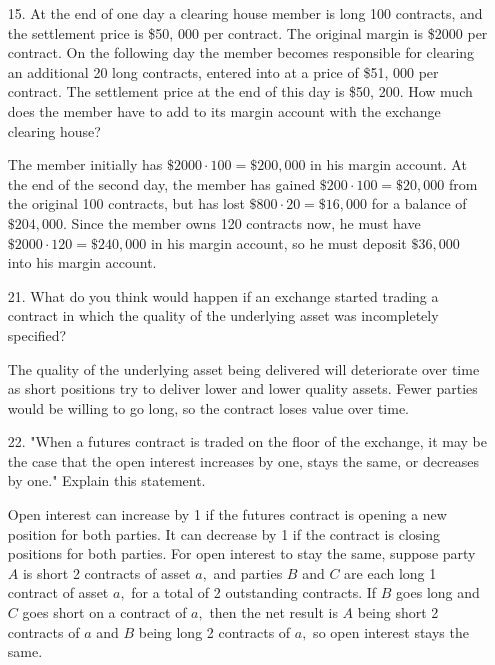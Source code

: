 \documentclass{article}
\begin{document}
\begin{itemize}
	\item[15.] At the end of one day a clearing house member is long 100 contracts, and the settlement price is \$50, 000 per contract. The original margin is \$2000 per contract. On the following day the member becomes responsible for clearing an additional 20 long contracts, entered into at a price of \$51, 000 per contract. The settlement price at the end of this day is \$50, 200. How much does the member have to add to its margin account with the exchange clearing house?
		\begin{soln}
			The member initially has $\$2000\cdot 100=\$200, 000$ in his margin account. At the end of the second day, the member has gained $\$200\cdot 100 = \$20, 000$ from the original 100 contracts, but has lost $\$800\cdot 20 = \$16, 000$ for a balance of $\$204, 000.$ Since the member owns 120 contracts now, he must have $\$2000\cdot 120 = \$240, 000$ in his margin account, so he must deposit $\$36, 000$ into his margin account.
		\end{soln}

	\item[21.] What do you think would happen if an exchange started trading a contract in which the quality of the underlying asset was incompletely specified?
		\begin{answer*}
			The quality of the underlying asset being delivered will deteriorate over time as short positions try to deliver lower and lower quality assets. Fewer parties would be willing to go long, so the contract loses value over time.
		\end{answer*}

	\item[22.] "When a futures contract is traded on the floor of the exchange, it may be the case that the open interest increases by one, stays the same, or decreases by one." Explain this statement.
		\begin{answer*}
			Open interest can increase by 1 if the futures contract is opening a new position for both parties. It can decrease by 1 if the contract is closing positions for both parties. For open interest to stay the same, suppose party $A$ is short 2 contracts of asset $a,$ and parties $B$ and $C$ are each long 1 contract of asset $a,$ for a total of 2 outstanding contracts. If $B$ goes long and $C$ goes short on a contract of $a,$ then the net result is $A$ being short 2 contracts of $a$ and $B$ being long 2 contracts of $a,$ so open interest stays the same.
		\end{answer*}


\end{itemize}
\end{document}
